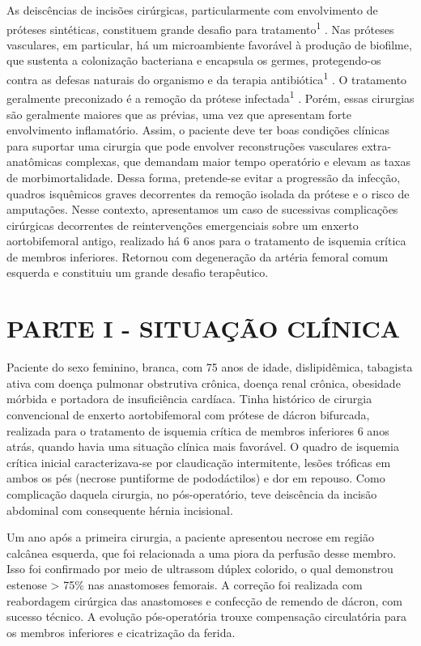 \documentclass[numberinsection,times,10pt,spreadimages]{memoir}
\begin{document}
As deiscências de incisões cirúrgicas, particularmente com envolvimento de
próteses
sintéticas, constituem grande desafio para tratamento\textsuperscript{1}
. Nas próteses vasculares, em particular, há um
microambiente favorável à produção de biofilme, que sustenta a colonização
bacteriana e encapsula os germes, protegendo-os contra as defesas naturais do
organismo e da terapia antibiótica\textsuperscript{1}
. O tratamento geralmente preconizado é a remoção da prótese
infectada\textsuperscript{1}
. Porém, essas
cirurgias são geralmente maiores que as prévias, uma vez que apresentam forte
envolvimento inflamatório. Assim, o paciente deve ter boas condições clínicas
para
suportar uma cirurgia que pode envolver reconstruções vasculares
extra-anatômicas
complexas, que demandam maior tempo operatório e elevam as taxas de
morbimortalidade. Dessa forma, pretende-se evitar a progressão da infecção,
quadros
isquêmicos graves decorrentes da remoção isolada da prótese e o risco de
amputações.
Nesse contexto, apresentamos um caso de sucessivas complicações cirúrgicas
decorrentes de reintervenções emergenciais sobre um enxerto aortobifemoral
antigo,
realizado há 6 anos para o tratamento de isquemia crítica de membros inferiores.
Retornou com degeneração da artéria femoral comum esquerda e constituiu um
grande
desafio terapêutico.

\section{PARTE I - SITUAÇÃO CLÍNICA}

Paciente do sexo feminino, branca, com 75 anos de idade, dislipidêmica,
tabagista
ativa com doença pulmonar obstrutiva crônica, doença renal crônica, obesidade
mórbida e portadora de insuficiência cardíaca. Tinha histórico de cirurgia
convencional de enxerto aortobifemoral com prótese de dácron bifurcada,
realizada
para o tratamento de isquemia crítica de membros inferiores 6 anos atrás, quando
havia uma situação clínica mais favorável. O quadro de isquemia crítica inicial
caracterizava-se por claudicação intermitente, lesões tróficas em ambos os pés
(necrose puntiforme de pododáctilos) e dor em repouso. Como complicação daquela
cirurgia, no pós-operatório, teve deiscência da incisão abdominal com
consequente
hérnia incisional.

Um ano após a primeira cirurgia, a paciente apresentou necrose em região
calcânea
esquerda, que foi relacionada a uma piora da perfusão desse membro. Isso foi
confirmado por meio de ultrassom dúplex colorido, o qual demonstrou estenose >
75\% nas anastomoses femorais. A correção foi realizada com reabordagem
cirúrgica das
anastomoses e confecção de remendo de dácron, com sucesso técnico. A evolução
pós-operatória trouxe compensação circulatória para os membros inferiores e
cicatrização da ferida.
\end{document}

